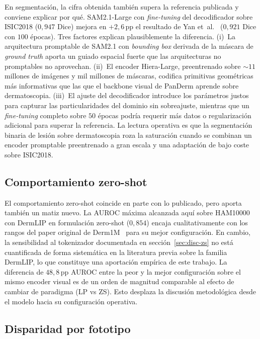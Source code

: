 En segmentación, la cifra obtenida también supera la referencia
publicada y conviene explicar por qué. SAM2.1-Large con
\emph{fine-tuning} del decodificador sobre ISIC2018 ($0{,}947$
Dice) mejora en $+2{,}6$\,pp el resultado de
Yan et~al.~\cite{panderm2025} ($0{,}921$ Dice con $100$ épocas).
Tres factores explican plausiblemente la diferencia. (i)~La
arquitectura promptable de SAM2.1 con \emph{bounding box} derivada
de la máscara de \emph{ground truth} aporta un guiado espacial
fuerte que las arquitecturas no promptables no aprovechan. (ii)~El
encoder Hiera-Large, preentrenado sobre $\sim 11$ millones de
imágenes y mil millones de máscaras, codifica primitivas
geométricas más informativas que las que el backbone visual de
PanDerm aprende sobre dermatoscopia. (iii)~El ajuste del
decodificador introduce los parámetros justos para capturar las
particularidades del dominio sin sobreajuste, mientras que un
\emph{fine-tuning} completo sobre $50$ épocas podría requerir más
datos o regularización adicional para superar la referencia. La
lectura operativa es que la segmentación binaria de lesión sobre
dermatoscopia roza la saturación cuando se combinan un encoder
promptable preentrenado a gran escala y una adaptación de bajo coste
sobre ISIC2018.

\subsection{Comportamiento zero-shot}
\label{sec:lit-zs}

El comportamiento zero-shot coincide en parte con lo publicado,
pero aporta también un matiz nuevo. La AUROC máxima alcanzada aquí
sobre HAM10000 con DermLIP en formulación zero-shot ($0{,}854$)
encaja cualitativamente con los rangos del paper original de
Derm1M~\cite{derm1m} para su mejor configuración. En cambio, la
sensibilidad al tokenizador documentada en
sección~\ref{sec:disc-zs} no está cuantificada de forma
sistemática en la literatura previa sobre la familia DermLIP, lo que
constituye una aportación empírica de este trabajo. La diferencia de
$48{,}8$\,pp AUROC entre la peor y la mejor configuración sobre el
mismo encoder visual es de un orden de magnitud comparable al efecto
de cambiar de paradigma (LP vs ZS). Esto desplaza la discusión
metodológica desde el modelo hacia su configuración operativa.

\subsection{Disparidad por fototipo}
\label{sec:lit-equidad}

